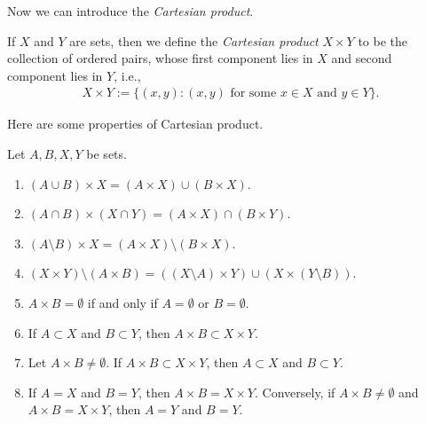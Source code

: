 Now we can introduce the \emph{Cartesian product}.

\begin{definition}
    If $X$ and $Y$ are sets, then we define the \emph{Cartesian product} $X \times Y$ to be the collection of ordered pairs, whose first component lies in $X$ and second component lies in $Y$, i.e.,
    \begin{align*}
        X \times Y := \{(x, y) : (x, y) \text{ for some }x \in X \text{ and } y \in Y\}.
    \end{align*}
\end{definition}

Here are some properties of Cartesian product.

\begin{proposition}
    Let $A, B, X, Y$ be sets.
    \begin{enumerate}
        \item $(A \cup B) \times X = (A \times X) \cup (B \times X)$.
        \item $(A \cap B) \times (X \cap Y) = (A \times X) \cap (B \times Y)$.
        \item $(A \setminus B) \times X = (A \times X) \setminus (B \times X)$.
        \item $(X \times Y) \setminus (A \times B) = ((X \setminus A) \times Y) \cup (X \times (Y \setminus B))$.
        \item $A \times B = \emptyset$ if and only if $A = \emptyset$ or $B = \emptyset$.
        \item If $A \subset X$ and $B \subset Y$, then $A \times B \subset X \times Y$.
        \item Let $A \times B \neq \emptyset$. If $A \times B \subset X \times Y$, then $A \subset X$ and $B \subset Y$.
        \item If $A = X$ and $B = Y$, then $A \times B = X \times Y$. Conversely, if $A \times B \neq \emptyset$ and $A \times B = X \times Y$, then $A = Y$ and $B = Y$.
    \end{enumerate}
\end{proposition}


